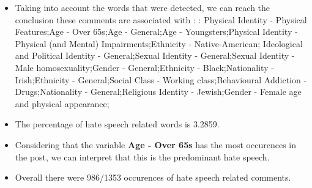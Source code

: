 \documentclass[11pt]{article}
\begin{document}
\begin{itemize}\item Taking into account the words that were detected, we can reach the conclusion these comments are associated with : : Physical Identity - Physical Features;Age - Over 65s;Age - General;Age - Youngsters;Physical Identity - Physical (and Mental) Impairments;Ethnicity - Native-American; Ideological and Political Identity - General;Sexual Identity - General;Sexual Identity - Male homosexuality;Gender - General;Ethnicity - Black;Nationality - Irish;Ethnicity - General;Social Class - Working class;Behavioural Addiction - Drugs;Nationality - General;Religious Identity - Jewish;Gender - Female age and physical appearance;%

\item The percentage of hate speech related words is 3.2859.

\item Considering that the variable \textbf{Age - Over 65s} has the most occurences in the post, we can interpret that this is the predominant hate speech.

\item Overall there were 986/1353 occurences of hate speech related comments.\end{itemize}
\end{document}
